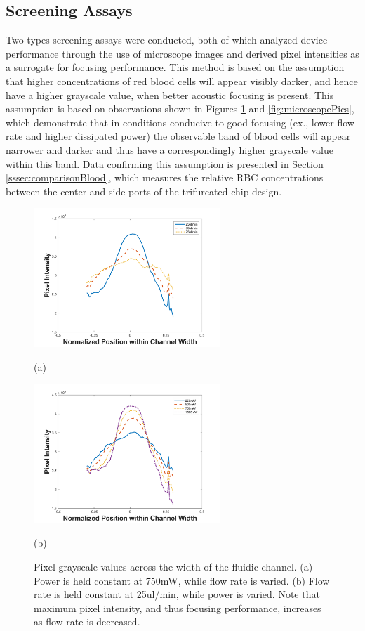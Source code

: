 \subsection{Screening Assays}
\label{ssec:screen}
Two types screening assays were conducted, both of which analyzed device performance through the use of microscope images and derived pixel intensities as a surrogate for focusing performance. This method is based on the assumption that higher concentrations of red blood cells will appear visibly darker, and hence have a higher grayscale value, when better acoustic focusing is present. This assumption is based on observations shown in Figures \ref{fig:pixelPerformance} and \ref{fig:microscopePics}, which demonstrate that in conditions conducive to good focusing (ex., lower flow rate and higher dissipated power) the observable band of blood cells will appear narrower and darker and thus have a correspondingly higher grayscale value within this band. Data confirming this assumption is presented in Section \ref{sssec:comparisonBlood}, which measures the relative RBC concentrations between the center and side ports of the trifurcated chip design.

\begin{figure}[htb]
  \begin{minipage}[t]{0.49\linewidth}\centering
    \includegraphics[width=7cm]{Baseline3PromFlow}
    \medskip
    \centerline{(a)}
  \end{minipage}\hfill
  \begin{minipage}[t]{0.49\linewidth}\centering
    \includegraphics[width=7cm]{Baseline3PromPower}
    \medskip
    \centerline{(b)}
  \end{minipage}
  \caption[Pixel grayscale values across the width of the fluidic channel]{Pixel grayscale values across the width of the fluidic channel. (a) Power is held constant at 750mW, while flow rate is varied. (b) Flow rate is held constant at 25ul/min, while power is varied. Note that maximum pixel intensity, and thus focusing performance, increases as flow rate is decreased.}
	\label{fig:pixelPerformance}
\end{figure}

